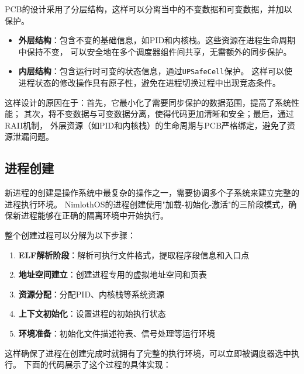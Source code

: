 PCB的设计采用了分层结构，这样可以分离当中的不变数据和可变数据，并加以保护。

\begin{itemize}
    \item \textbf{外层结构}：包含不变的基础信息，如PID和内核栈。这些资源在进程生命周期中保持不变，
    可以安全地在多个调度器组件间共享，无需额外的同步保护。
    \item \textbf{内层结构}：包含运行时可变的状态信息，通过\lstinline[language=Rust]{UPSafeCell}保护。
    这样可以使进程状态的修改操作具有原子性，避免在进程切换过程中出现竞态条件。
\end{itemize}

这样设计的原因在于：首先，它最小化了需要同步保护的数据范围，提高了系统性能；
其次，将不变数据与可变数据分离，使得代码更加清晰和安全；最后，通过RAII机制，
外层资源（如PID和内核栈）的生命周期与PCB严格绑定，避免了资源泄漏问题。

\subsection{进程创建}

新进程的创建是操作系统中最复杂的操作之一，需要协调多个子系统来建立完整的进程执行环境。
NimlothOS的进程创建使用"加载-初始化-激活"的三阶段模式，确保新进程能够在正确的隔离环境中开始执行。

整个创建过程可以分解为以下步骤：
\begin{enumerate}
    \item \textbf{ELF解析阶段}：解析可执行文件格式，提取程序段信息和入口点
    \item \textbf{地址空间建立}：创建进程专用的虚拟地址空间和页表
    \item \textbf{资源分配}：分配PID、内核栈等系统资源
    \item \textbf{上下文初始化}：设置进程的初始执行状态
    \item \textbf{环境准备}：初始化文件描述符表、信号处理等运行环境
\end{enumerate}

这样确保了进程在创建完成时就拥有了完整的执行环境，可以立即被调度器选中执行。
下面的代码展示了这个过程的具体实现：

